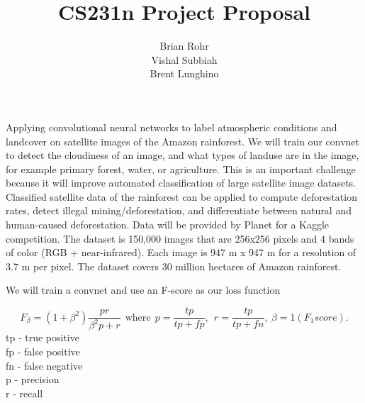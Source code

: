 \documentclass[12pt]{article}
\title{CS231n Project Proposal}
\author{Brian Rohr\\Vishal Subbiah\\Brent Lunghino}
\begin{document}
\maketitle	

Applying convolutional neural networks to label atmospheric conditions and landcover on satellite images of the Amazon rainforest. We will train our convnet to detect the cloudiness of an image, and what types of landuse are in the image, for example primary forest, water, or agriculture. This is an important challenge because it will improve automated classification of large satellite image datasets. Classified satellite data of the rainforest can be applied to compute deforestation rates, detect illegal mining/deforestation, and differentiate between natural and human-caused deforestation.
Data will be provided by Planet for a Kaggle competition. The dataset is 150,000 images that are 256x256 pixels and 4 bands of color (RGB + near-infrared). Each image is 947 m x 947 m for a resolution of 3.7 m per pixel. The dataset covers 30 million hectares of Amazon rainforest. 

We will train a convnet and use an F-score as our loss function

\begin{equation} \label{eq:F_score}
F_{\beta}=(1 + \beta^2) \frac{pr}{\beta^2 p+r}\ \ \mathrm{where}\ \ p = \frac{tp}{tp+fp},\ \ r = \frac{tp}{tp+fn},\ \beta = 1 (F_1 score).
\end{equation}
tp - true positive \\
fp - false positive \\
fn - false negative \\
p - precision \\
r - recall\\
\end{document}
